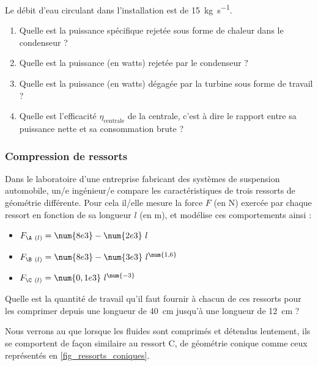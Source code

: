 	Le débit d’eau circulant dans l’installation est de \SI{15}{\kilogram\per\second}.

	\begin{enumerate}
		\item Quelle est la puissance spécifique rejetée sous forme de chaleur dans le condenseur ?
		\item Quelle est la puissance (en \si{watts}) rejetée par le condenseur ?
		\item Quelle est la puissance (en \si{watts}) dégagée par la turbine sous forme de travail ?
		\item Quelle est l’efficacité $\eta_{\text{centrale}}$ de la centrale, c’est à dire le rapport entre sa puissance nette et sa consommation brute ?
	\end{enumerate}	

\subsubsection{Compression de ressorts}
\label{exo_compression_ressorts}
	
	Dans le laboratoire d’une entreprise fabricant des systèmes de suspension automobile, un/e ingénieur/e compare les caractéristiques de trois ressorts de géométrie différente. Pour cela il/elle mesure la force $F$ (en \si{\newton}) exercée par chaque ressort en fonction de sa longueur $l$ (en \si{\metre}), et modélise ces comportements ainsi :
	
		\begin{itemize}
			\item $F_{\A\ (l)} = \num{8e3} - \num{2e3} \ l$
			\item $F_{\B\ (l)} = \num{8e3} - \num{3e3} \ l^{\num{1,6}}$
			\item $F_{\C\ (l)} = \num{0,1e3} \ l^{\num{-3}}$
		\end{itemize}
		
	Quelle est la quantité de travail qu’il faut fournir à chacun de ces ressorts pour les comprimer depuis une longueur de \SI{40}{\centi\metre} jusqu’à une longueur de \SI{12}{\centi\metre} ?
	
	Nous verrons au \coursdeux que lorsque les fluides sont comprimés et détendus lentement, ils se comportent de façon similaire au ressort C, de géométrie conique comme ceux représentés en \cref{fig_ressorts_coniques}.
	
